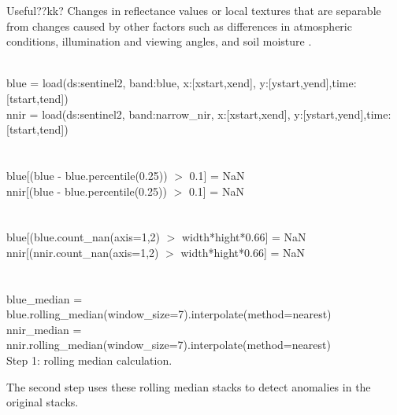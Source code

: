 \documentclass[essd, manuscript]{copernicus}
\begin{document}
Useful??kk? Changes in reflectance values or local textures that are separable from changes caused by other factors such as differences in atmospheric conditions, illumination and viewing angles, and soil moisture \citep{deng2008pca}.

\begin{algorithm}[H]
\SetAlgoLined
 \\
 blue = load(ds:sentinel2, band:blue, x:[xstart,xend], y:[ystart,yend],time:[tstart,tend])\\
 nnir = load(ds:sentinel2, band:narrow\_nir, x:[xstart,xend], y:[ystart,yend],time:[tstart,tend])\\
 \\
 \\
 blue[(blue - blue.percentile(0.25)) $>$ 0.1] = NaN\\
 nnir[(blue - blue.percentile(0.25)) $>$ 0.1] = NaN\\
 \\
 \\
 blue[(blue.count\_nan(axis=1,2) $>$ width*hight*0.66] = NaN\\
 nnir[(nnir.count\_nan(axis=1,2) $>$ width*hight*0.66] = NaN\\
 \\
 \\
 blue\_median = blue.rolling\_median(window\_size=7).interpolate(method=nearest)\\
 nnir\_median = nnir.rolling\_median(window\_size=7).interpolate(method=nearest)\\
 \caption{Step 1: rolling median calculation.}
\end{algorithm}

The second step uses these rolling median stacks to detect anomalies in the original stacks. 
\end{document}
